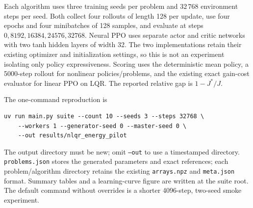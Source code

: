 \documentclass[11pt]{article}
\begin{document}
Each algorithm uses three training seeds per problem and $32\,768$ environment
steps per seed. Both collect four rollouts of length 128 per update, use four epochs
and four minibatches of 128 samples, and evaluate at steps
$0,8192,16384,24576,32768$. Neural PPO uses separate actor and critic networks with
two tanh hidden layers of width 32. The two implementations retain their existing
optimizer and initialization settings, so this is not an experiment isolating only
policy expressiveness. Scoring uses the deterministic mean policy, a 5000-step
rollout for nonlinear policies/problems, and the existing exact gain-cost evaluator
for linear PPO on LQR. The reported relative gap is $1-J^*/J$.

The one-command reproduction is
\begin{verbatim}
uv run main.py suite --count 10 --seeds 3 --steps 32768 \
    --workers 1 --generator-seed 0 --master-seed 0 \
    --out results/nlqr_energy_pilot
\end{verbatim}
The output directory must be new; omit \texttt{--out} to use a timestamped directory.
\texttt{problems.json} stores the generated parameters and exact references;
each problem/algorithm directory retains the existing \texttt{arrays.npz} and
\texttt{meta.json} format. Summary tables and a learning-curve figure are written
at the suite root. The default command without overrides is a shorter
4096-step, two-seed smoke experiment.
\end{document}
